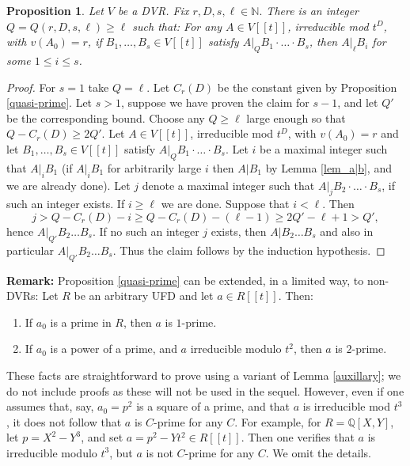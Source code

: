 \documentclass{article}
\newcommand{\N}{\mathbb{N}}
\theoremstyle{plain}
\newtheorem{proposition}[theorem]{Proposition}
\theoremstyle{definition}
\theoremstyle{remark}
\theoremstyle{plain}
\begin{document}
\begin{proposition} \label{quasi_divides}
    Let $V$ be a DVR. Fix $r,D,s,\ell \in \N.$ There is an integer $Q = Q(r,D,s,\ell) \geq \ell$ such that: For any $A \in V[[t]]$, irreducible mod $t^D$, with $v(A_0) = r$, if $B_1,\ldots,B_s \in V[[t]]$ satisfy $A|_Q B_1 \cdot \ldots \cdot B_s$, then $A|_\ell B_i$ for some $1\leq i \leq s$.
    
\end{proposition}

\begin{proof}
For $s = 1$ take $Q = \ell$. Let $C_r(D)$ be the constant given by Proposition \ref{quasi-prime}. Let $s >1$, suppose we have proven the claim for $s-1$, and let $Q'$ be the corresponding bound. Choose any $Q\geq \ell$ large enough so that $Q-C_r(D)\geq 2Q'$. Let $A \in V[[t]]$, irreducible mod $t^D$, with $v(A_0) = r$ and let $B_1,\ldots,B_s \in V[[t]]$ satisfy $A|_Q B_1 \cdot \ldots \cdot B_s$. Let $i$ be a maximal integer such that $A|_iB_1$ (if $A|_iB_1$ for arbitrarily large $i$ then $A|B_1$ by Lemma \ref{lem_a|b}, and we are already done). Let $j$ denote a maximal integer such that $A|_jB_2\cdot \ldots \cdot B_s$, if such an integer exists. If $i \geq \ell$ we are done. Suppose that $i < \ell$. Then 
$$j > Q-C_r(D)-i \geq Q-C_r(D)-(\ell-1)\geq 2Q'-\ell+1> Q',$$
hence $A|_{Q'} B_2\ldots B_s$. If no such an integer $j$ exists, then $A| B_2\ldots B_s$ and also in particular  $A|_{Q'} B_2\ldots B_s$. Thus the claim follows by the induction hypothesis.  



\end{proof}
\noindent\textbf{Remark:} Proposition \ref{quasi-prime} can be extended, in a limited way, to non-DVRs: Let $R$ be an arbitrary UFD and let $a \in R[[t]]$. Then:\begin{enumerate}
    \item If $a_0$ is a prime in $R$, then $a$ is $1$-prime.
    \item If $a_0$ is a power of a prime, and $a$ irreducible modulo $t^2$, then $a$ is $2$-prime. 
\end{enumerate} 

These facts are straightforward to prove using a variant of Lemma \ref{auxillary}; we do not include proofs as these will not be used in the sequel. However, even if one assumes that, say, $a_0 = p^2$ is a square of a prime, and that $a$ is irreducible mod $t^3$, it does not follow that $a$ is $C$-prime for any $C$. For example, for $R=\mathbb Q[X,Y]$, let $p=X^2-Y^3$, and set $a=p^2-Yt^2\in R[[t]]$. Then one verifies that $a$ is irreducible modulo $t^3$, but $a$ is not $C$-prime for any $C$. We omit the details.
\end{document}
